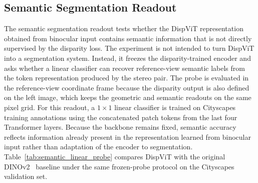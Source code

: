\subsection{Semantic Segmentation Readout}
\label{sec:dispvit_semantic_experiments}
The semantic segmentation readout tests whether the DispViT representation obtained from binocular input contains semantic information that is not directly supervised by the disparity loss.
The experiment is not intended to turn DispViT into a segmentation system.
Instead, it freezes the disparity-trained encoder and asks whether a linear classifier can recover reference-view semantic labels from the token representation produced by the stereo pair.
The probe is evaluated in the reference-view coordinate frame because the disparity output is also defined on the left image, which keeps the geometric and semantic readouts on the same pixel grid.
For this readout, a $1 \times 1$ linear classifier is trained on Cityscapes~\cite{Cordts2016Cityscapes} training annotations using the concatenated patch tokens from the last four Transformer layers.
Because the backbone remains fixed, semantic accuracy reflects information already present in the representation learned from binocular input rather than adaptation of the encoder to segmentation.
Table~\ref{tab:semantic_linear_probe} compares DispViT with the original DINOv2~\cite{oquab2023dinov2} baseline under the same frozen-probe protocol on the Cityscapes validation set.

